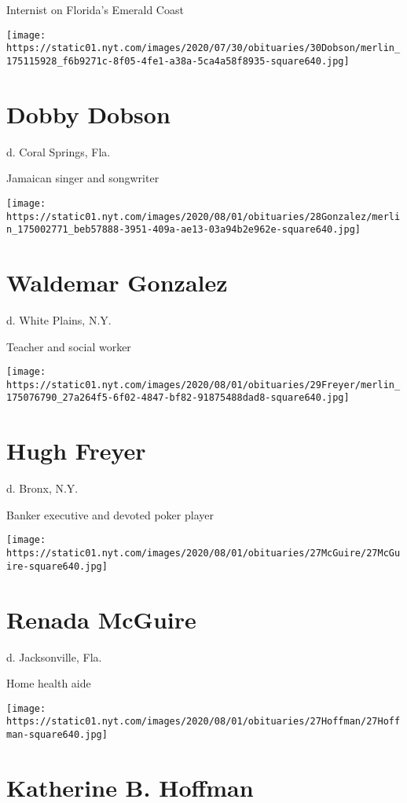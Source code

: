 Internist on Florida's Emerald Coast

\texttt{[image: https://static01.nyt.com/images/2020/07/30/obituaries/30Dobson/merlin\_175115928\_f6b9271c-8f05-4fe1-a38a-5ca4a58f8935-square640.jpg]}

\hypertarget{dobby-dobson}{%
\section{Dobby Dobson}\label{dobby-dobson}}

d. Coral Springs, Fla.

Jamaican singer and songwriter

\texttt{[image: https://static01.nyt.com/images/2020/08/01/obituaries/28Gonzalez/merlin\_175002771\_beb57888-3951-409a-ae13-03a94b2e962e-square640.jpg]}

\hypertarget{waldemar-gonzalez}{%
\section{Waldemar Gonzalez}\label{waldemar-gonzalez}}

d. White Plains, N.Y.

Teacher and social worker

\texttt{[image: https://static01.nyt.com/images/2020/08/01/obituaries/29Freyer/merlin\_175076790\_27a264f5-6f02-4847-bf82-91875488dad8-square640.jpg]}

\hypertarget{hugh-freyer}{%
\section{Hugh Freyer}\label{hugh-freyer}}

d. Bronx, N.Y.

Banker executive and devoted poker player

\texttt{[image: https://static01.nyt.com/images/2020/08/01/obituaries/27McGuire/27McGuire-square640.jpg]}

\hypertarget{renada-mcguire}{%
\section{Renada McGuire}\label{renada-mcguire}}

d. Jacksonville, Fla.

Home health aide

\texttt{[image: https://static01.nyt.com/images/2020/08/01/obituaries/27Hoffman/27Hoffman-square640.jpg]}

\hypertarget{katherine-b-hoffman}{%
\section{Katherine B. Hoffman}\label{katherine-b-hoffman}}

